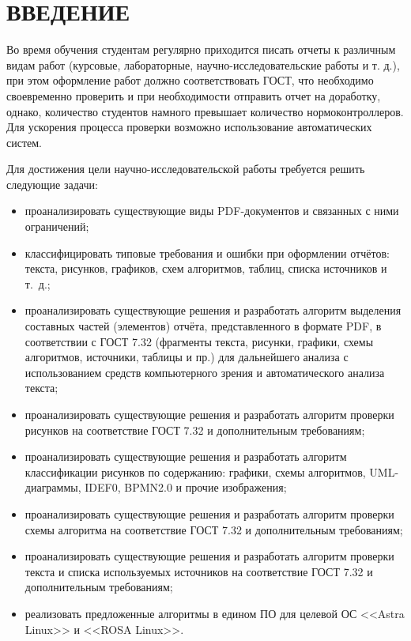 \chapter*{ВВЕДЕНИЕ}

Во время обучения студентам регулярно приходится писать отчеты к различным видам работ (курсовые, лабораторные, научно-исследовательские работы и т. д.), при этом оформление работ должно соответствовать ГОСТ, что необходимо своевременно проверить и при необходимости отправить отчет на доработку, однако, количество студентов намного превышает количество нормоконтроллеров. Для ускорения процесса проверки возможно использование автоматических систем.

Для достижения цели научно-исследовательской работы требуется решить следующие задачи:
\begin{itemize}
	\item проанализировать существующие виды PDF-документов и связанных с ними ограничений;
	\item классифицировать типовые требования и ошибки при оформлении отчётов: текста, рисунков, графиков, схем алгоритмов, таблиц, списка источников и т.~д.;
	\item проанализировать существующие решения и разработать алгоритм выделения составных частей (элементов) отчёта, представленного в формате PDF, в соответствии с ГОСТ 7.32 (фрагменты текста, рисунки, графики, схемы алгоритмов, источники, таблицы и пр.) для дальнейшего анализа с использованием средств компьютерного зрения и автоматического анализа текста;
	\item проанализировать существующие решения и разработать алгоритм проверки рисунков на соответствие ГОСТ 7.32 и дополнительным требованиям;
	\item проанализировать существующие решения и разработать алгоритм классификации рисунков по содержанию: графики, схемы алгоритмов, UML-диаграммы, IDEF0, BPMN2.0 и прочие изображения;
	\item проанализировать существующие решения и разработать алгоритм проверки схемы алгоритма на соответствие ГОСТ 7.32 и дополнительным требованиям;
	\item проанализировать существующие решения и разработать алгоритм проверки текста и списка используемых источников на соответствие ГОСТ 7.32 и дополнительным требованиям;
	\item реализовать предложенные алгоритмы в едином ПО для целевой ОС <<Astra Linux>> и <<ROSA Linux>>.
\end{itemize}
